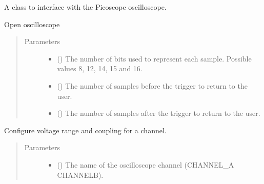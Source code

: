 \documentclass[letterpaper,10pt,english]{sphinxmanual}
\begin{document}
\begin{fulllineitems}
\label{\detokenize{reference_doc:Picoscope}}
A class to interface with the Picoscope oscilloscope.

\begin{fulllineitems}
\label{\detokenize{reference_doc:Picoscope.__init__}}
Open oscilloscope
\begin{quote}\begin{description}
\item[{Parameters}] \leavevmode\begin{itemize}
\item {} 
 () \textendash{} The number of bits used to represent each sample. Possible values 8, 12, 14, 15 and 16.

\item {} 
 () \textendash{} The number of samples before the trigger to return to the user.

\item {} 
 () \textendash{} The number of samples after the trigger to return to the user.

\end{itemize}

\end{description}\end{quote}

\end{fulllineitems}


\begin{fulllineitems}
\label{\detokenize{reference_doc:Picoscope.setChannel}}
Configure voltage range and coupling for a channel.
\begin{quote}\begin{description}
\item[{Parameters}] \leavevmode\begin{itemize}
\item {} 
 () \textendash{} The name of the oscilloscope channel (CHANNEL\_A \textbar{} CHANNELB).


\end{itemize}
\end{description}
\end{quote}
\end{fulllineitems}
\end{fulllineitems}
\end{document}
